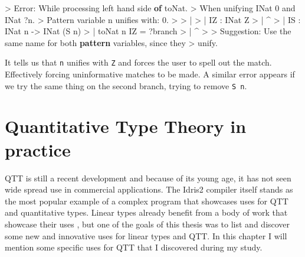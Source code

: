 \documentclass[
]{article}
\newenvironment{Shaded}{}{}
\newcommand{\DataTypeTok}[1]{\textcolor[rgb]{0.56,0.13,0.00}{#1}}
\newcommand{\DecValTok}[1]{\textcolor[rgb]{0.25,0.63,0.44}{#1}}
\newcommand{\FunctionTok}[1]{\textcolor[rgb]{0.02,0.16,0.49}{#1}}
\newcommand{\KeywordTok}[1]{\textcolor[rgb]{0.00,0.44,0.13}{\textbf{#1}}}
\newcommand{\NormalTok}[1]{#1}
\newcommand{\OperatorTok}[1]{\textcolor[rgb]{0.40,0.40,0.40}{#1}}
\newcommand{\OtherTok}[1]{\textcolor[rgb]{0.00,0.44,0.13}{#1}}
\begin{document}
\begin{Shaded}
\begin{Highlighting}[]
\OperatorTok{\textgreater{}} \DataTypeTok{Error}\OperatorTok{:} \DataTypeTok{While}\NormalTok{ processing left hand side }\KeywordTok{of}\NormalTok{ toNat}\OperatorTok{.} 
\OperatorTok{\textgreater{}}   \DataTypeTok{When}\NormalTok{ unifying }\DataTypeTok{INat} \DecValTok{0} \FunctionTok{and} \DataTypeTok{INat} \OperatorTok{?}\NormalTok{n}\OperatorTok{.}
\OperatorTok{\textgreater{}} \DataTypeTok{Pattern}\NormalTok{ variable n unifies with}\OperatorTok{:} \DecValTok{0}\OperatorTok{.}
\OperatorTok{\textgreater{}} 
\OperatorTok{\textgreater{}}     \OperatorTok{|}
\OperatorTok{\textgreater{}}     \OperatorTok{|}   \DataTypeTok{IZ} \OperatorTok{:} \DataTypeTok{INat} \DataTypeTok{Z}
\OperatorTok{\textgreater{}}     \OperatorTok{|}             \OperatorTok{\^{}}
\OperatorTok{\textgreater{}}     \OperatorTok{|}   \DataTypeTok{IS} \OperatorTok{:} \DataTypeTok{INat}\NormalTok{ n }\OtherTok{{-}\textgreater{}} \DataTypeTok{INat}\NormalTok{ (}\DataTypeTok{S}\NormalTok{ n)}
\OperatorTok{\textgreater{}}     \OperatorTok{|}\NormalTok{  toNat n }\DataTypeTok{IZ} \OtherTok{=} \OperatorTok{?}\NormalTok{branch}
\OperatorTok{\textgreater{}}     \OperatorTok{|}        \OperatorTok{\^{}}
\OperatorTok{\textgreater{}} 
\OperatorTok{\textgreater{}} \DataTypeTok{Suggestion}\OperatorTok{:} \DataTypeTok{Use}\NormalTok{ the same name for both }\KeywordTok{pattern}\NormalTok{ variables, since they }
\OperatorTok{\textgreater{}}\NormalTok{   unify}\OperatorTok{.}
\end{Highlighting}
\end{Shaded}

It tells us that \texttt{n} unifies with \texttt{Z} and forces the user
to spell out the match. Effectively forcing uninformative matches to be
made. A similar error appears if we try the same thing on the second
branch, trying to remove \texttt{S\ n}.

\newpage

\hypertarget{quantitative-type-theory-in-practice}{%
\section{Quantitative Type Theory in
practice}\label{quantitative-type-theory-in-practice}}

QTT is still a recent development and because of its young age, it has
not seen wide spread use in commercial applications. The Idris2 compiler
itself stands as the most popular example of a complex program that
showcases uses for QTT and quantitative types. Linear types already
benefit from a body of work that showcase their uses
\cite{linear_diff}\cite{linear_types_update}\cite{linear_types_session}\cite{linear_types_subst}\cite{actor_channels}\cite{linear_race}\cite{linear_use}\cite{once_upon_a_type}\cite{deforestation},
but one of the goals of this thesis was to list and discover some new
and innovative uses for linear types and QTT. In this chapter I will
mention some specific uses for QTT that I discovered during my study.
\end{document}
